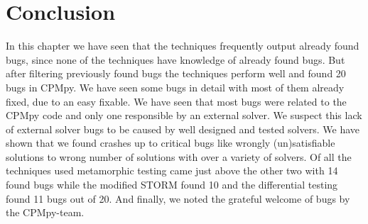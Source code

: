 

\section{Conclusion}
\label{res:conclusion}
In this chapter we have seen that the techniques frequently output already found bugs, since none of the techniques have knowledge of already found bugs. But after filtering previously found bugs the techniques perform well and found 20 bugs in CPMpy. We have seen some bugs in detail with most of them already fixed, due to an easy fixable. We have seen that most bugs were related to the CPMpy code and only one responsible by an external solver. We suspect this lack of external solver bugs to be caused by well designed and tested solvers. We have shown that we found crashes up to critical bugs like wrongly (un)satisfiable solutions to wrong number of solutions with over a variety of solvers. Of all the techniques used metamorphic testing came just above the other two with 14 found bugs while the modified STORM found 10 and the differential testing found 11 bugs out of 20. And finally, we noted the grateful welcome of bugs by the CPMpy-team.

